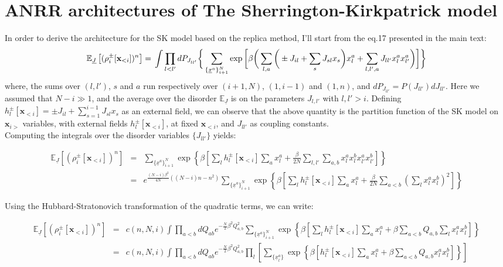 \documentclass[10pt, notitlepage]{revtex4-2}
\begin{document}
\section{ANRR architectures of The Sherrington-Kirkpatrick model}
In order to derive the architecture for the SK model based on the replica method, I'll start from the eq.17 presented in the main text:
\begin{equation}
\mathbb{E}_{\underline{J}}\left[(\rho_i^{\pm}[\mathbf{x}_{<i}])^n \right]  = \\
\int \prod_{l<l'} dP_{J_{ll'}} \bigg\{ 
\sum_{\{\underline{x}^{a}\}_{i+1}^N} \exp\bigg[\beta \bigg(
\sum_{l,a}\bigg( \pm J_{il} + \sum_{s} J_{sl} x_s \bigg) x_l^{a} + 
\sum_{l,l', a} J_{ll'} x_l^{a} x_{l'}^{a}
\bigg)  \bigg] 
\bigg\}
\end{equation}
where, the sums over $(l,l')$, $s$ and $a$ run respectively over $(i+1,N)$, $(1,i-1)$ and $(1,n)$, and $dP_{J_{ll'}}=P(J_{ll'})dJ_{ll'}$. Here we assumed that $N-i \gg 1$, and the average over the disorder $\mathbb{E}_{\underline{J}}$ is on the parameters $J_{l,l'}$ with $l,l'>i$. Defining $h_l^{\pm}[\mathbf{x}_{<i}] =\pm J_{il} + \sum_{s=1}^{i-1} J_{sl} x_s$ as an external field, we can observe that the above quantity is the partition function of the SK model on $\mathbf{x}_{i>}$ variables, with external fields $h_l^{\pm}[\mathbf{x}_{<i}]$, at fixed $\mathbf{x}_{<i}$, and $J_{ll'}$ as coupling constants. \\  
Computing the integrals over the disorder variables $\{J_{ll'}\}$ yields:
\begin{widetext}
\begin{eqnarray}
\mathbb{E}_{\underline{J}}\left[(\rho_i^{\pm}[\mathbf{x}_{<i}])^n \right] & = & 
\sum_{\{\underline{x}^{a}\}_{i+1}^N} 
\exp\left\{\beta \left[
\sum_{l} h_l^{\pm}[\mathbf{x}_{<i}] \sum_{a} x_l^{a} +\frac{\beta}{2N} \sum_{l,l'} \sum_{a,b} x_l^{a} x_l^{b} x_{l'}^{a}x_{l'}^{b} \right]  \right\} \\
& = & e^{ \frac{(N-i) \beta^2}{4N}((N-i)n-n^2) } 
\sum_{\{\underline{x}^{a}\}_{i+1}^N} 
\exp\left\{\beta \left[
\sum_{l} h_l^{\pm}[\mathbf{x}_{<i}] \sum_{a} x_l^{a} +\frac{\beta}{2N} \sum_{a<b} \left( \sum_{l}  x_l^{a} x_l^{b} \right)^2 \right]  \right\}
\end{eqnarray}
\end{widetext}
Using the Hubbard-Stratonovich transformation of the quadratic terms, we can write:
\begin{widetext}
\begin{eqnarray}
\mathbb{E}_{\underline{J}}\left[(\rho_i^{\pm}[\mathbf{x}_{<i}])^n \right] & = & 
c(n,N,i)
\int \prod_{a<b} dQ_{ab} e^{-\frac{N}{2}\beta^2Q_{a,b}^2}
\sum_{\{\underline{x}^{a}\}_{i+1}^N} 
\exp\left\{\beta \left[
\sum_{l} h_l^{\pm}[\mathbf{x}_{<i}] \sum_{a} x_l^{a} +\beta \sum_{a<b} Q_{a,b} \sum_{l}  x_l^{a} x_l^{b} \right]  \right\} \\
& = & 
c(n,N,i)
\int \prod_{a<b} dQ_{ab} e^{-\frac{N}{2}\beta^2Q_{a,b}^2}
\prod_{l} \left[
\sum_{\{\underline{x}^{a}_l\}} 
\exp\left\{\beta \left[
h_l^{\pm}[\mathbf{x}_{<i}] \sum_{a} x_l^{a} +\beta \sum_{a<b} Q_{a,b}  x_l^{a} x_l^{b} \right]  \right\}
\right] \label{eq:before_ansaltz}
\end{eqnarray}
\end{widetext}
\end{document}
